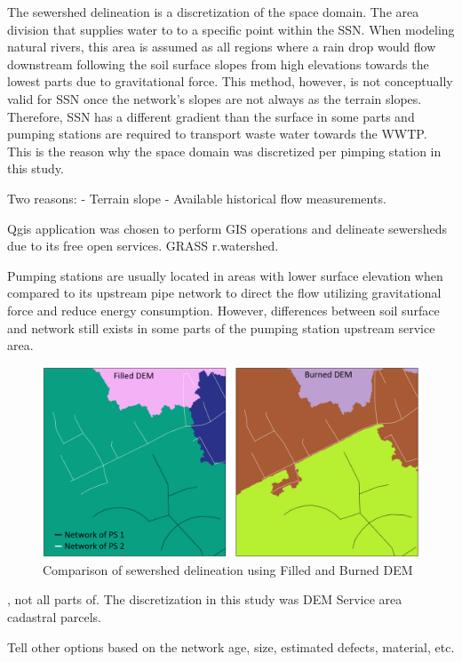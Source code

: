 The sewershed delineation is a discretization of the space domain. The area division that supplies water to to a specific point within the \ac{SSN}. When modeling natural rivers, this area is assumed as all regions where a rain drop would flow downstream following the soil surface slopes from high elevations towards the lowest parts due to gravitational force. This method, however, is not conceptually valid for \ac{SSN} once the network's slopes are not always as the terrain slopes. Therefore, \ac{SSN} has a different gradient than the surface in some parts and pumping stations are required to transport waste water towards the \acf{WWTP}. This is the reason why the space domain was discretized per pimping station in this study.


Two reasons:
- Terrain slope
- Available historical flow measurements.

Qgis application was chosen to perform GIS operations and delineate sewersheds due to its free open services. GRASS r.watershed. 


Pumping stations are usually located in areas with lower surface elevation when compared to its upstream pipe network to direct the flow utilizing gravitational force and reduce energy consumption. However, differences between soil surface and network still exists in some parts of the pumping station upstream service area. 


\begin{figure}[h]
    \centering
	\includegraphics[scale=0.6]{figures/burnedxfilledDEM.png}
	\caption{Comparison of sewershed delineation using Filled and Burned DEM}
	\label{fig:filledxburned}
\end{figure}


, not all parts of.
The discretization in this study was DEM  Service area cadastral parcels.

Tell other options based on the network age, size, estimated defects, material, etc. 


